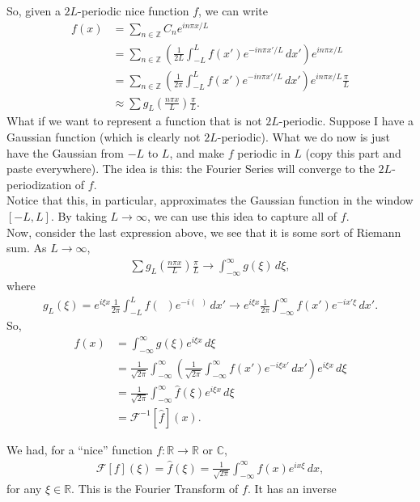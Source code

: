 \documentclass{book}
\theoremstyle{definition}
\newcommand{\R}{\mathbb{R}}
\newcommand{\F}{\mathcal{F}}
\begin{document}
So, given a $2L$-periodic nice function $f$, we can write
\begin{align*}
f(x) &= \sum_{n\in \mathbb{Z}}C_ne^{in\pi x/L}\\
&= \sum_{n\in \mathbb{Z}}\left(\frac{1}{2L}\int^L_{-L}f(x')e^{-in\pi x'/L}\,dx'\right)e^{in\pi x/L}\\
&= \sum_{n\in \mathbb{Z}}\left(\frac{1}{2\pi}\int^L_{-L}f(x')e^{-in\pi x'/L}\,dx' \right)  e^{in\pi x/L}\frac{\pi}{L}\\
&\approx \sum g_L\left(\frac{n\pi x}{L}\right)\frac{\pi}{L}.
\end{align*}
What if we want to represent a function that is not $2L$-periodic. Suppose I have a Gaussian function (which is clearly not $2L$-periodic). What we do now is just have the Gaussian from $-L$ to $L$, and make $f$ periodic in $L$ (copy this part and paste everywhere). The idea is this: the Fourier Series will converge to the $2L$-periodization of $f$. \\

Notice that this, in particular, approximates the Gaussian function in the window $[-L,L]$. By taking $L\to\infty$, we can use this idea to capture all of $f$.\\

Now, consider the last expression above, we see that it is some sort of Riemann sum. As $L \to \infty$, 
\begin{align*}
\sum g_L\left(\frac{n\pi x}{L}\right)\frac{\pi}{L} \to \int^\infty_{-\infty}g(\xi)\,d\xi,
\end{align*}
where
\begin{align*}
g_L(\xi) = e^{i\xi x}\frac{1}{2\pi}\int^L_{-L}f(\,\,\,)e^{-i(\,\,\,)}\,dx' \to e^{i\xi x}\frac{1}{2\pi}\int^\infty_{-\infty}f(x')e^{-ix'\xi}\,dx'.
\end{align*}
So,
\begin{align*}
f(x) &= \int^\infty_{-\infty}g(\xi)e^{i\xi x}\,d\xi\\
&= \frac{1}{\sqrt{2\pi}}\int^\infty_{-\infty}\left(\frac{1}{\sqrt{2\pi}}\int^\infty_{-\infty}f(x')e^{-i\xi x'}\,dx' \right)e^{i\xi x}\,d\xi\\
&=\frac{1}{\sqrt{2\pi}}\int^\infty_{-\infty}\hat{f}(\xi)e^{i\xi x}\,d\xi\\
&= \F^{-1}[\hat{f}](x).
\end{align*}



We had, for a ``nice'' function $f:\R \to \R$ or $\mathbb{C}$,
\begin{align*}
\F[f](\xi) = \hat{f}(\xi) = \frac{1}{\sqrt{2\pi}}\int^\infty_{-\infty} f(x)e^{ix\xi}\,dx,
\end{align*}
for any $\xi \in \R$. This is the Fourier Transform of $f$. It has an inverse
\end{document}
